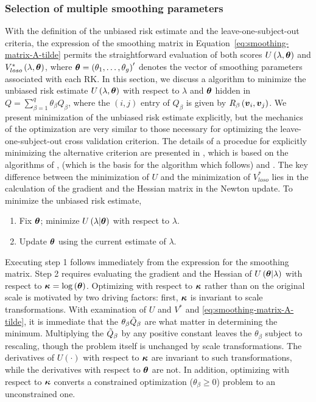\vspace{0.8in} 


\subsubsection{Selection of multiple smoothing parameters}

With the definition of the unbiased risk estimate and the leave-one-subject-out criteria, the expression of the smoothing matrix in Equation~\ref{eq:smoothing-matrix-A-tilde} permits the straightforward evaluation of both scores $U\left(\lambda, \mbox{\boldmath $\theta$} \right)$ and $V_{loso}^*\left(\lambda, \mbox{\boldmath $\theta$} \right)$, where $\mbox{\boldmath $\theta$} = \left(\theta_1,\dots, \theta_g\right)'$ denotes the vector of smoothing parameters associated with each RK.  In this section, we discuss a algorithm to minimize the unbiased risk estimate $U\left(\lambda, \mbox{\boldmath $\theta$}\right)$ with respect to $\lambda$ and $\mbox{\boldmath $\theta$}$ hidden in $Q = \sum_{\beta = 1}^q \theta_\beta Q_\beta$, where the $\left(i,j\right)$ entry of $Q_\beta$ is given by $R_\beta\left(\mbox{\boldmath $v$}_i,\mbox{\boldmath $v$}_j\right)$.  We present minimization of the unbiased risk estimate explicitly, but the mechanics of the optimization are very similar to those necessary for optimizing the leave-one-subject-out cross validation criterion. The details of a procedue for explicitly minimizing the alternative criterion are presented in \cite{xu2012asymptotic}, which is based on the algorithms of \cite{gu1991minimizing}, \cite{kim2004smoothing} (which is the basis for the algorithm which follows) and \cite{wood2004stable}. The key difference between the minimization of $U$ and the minimization of $V^*_{loso}$ lies in the calculation of the gradient and the Hessian matrix in the Newton update. To minimize the unbiased risk estimate,

\begin{enumerate}
\item Fix $\mbox{\boldmath $\theta$}$; minimize $U\left(\lambda \vert \mbox{\boldmath $\theta$}\right)$ with respect to $\lambda$.
\item Update $\mbox{\boldmath $\theta$}$ using the current estimate of $\lambda$.
\end{enumerate}

\noindent
Executing step 1 follows immediately from the expression for the smoothing matrix. Step 2 requires evaluating the gradient and the Hessian of $U\left( \mbox{\boldmath $\theta$} \vert \lambda \right)$ with respect to $\mbox{\boldmath $\kappa$} = \log\left(\mbox{\boldmath $\theta$}\right)$. Optimizing with respect to $\mbox{\boldmath $\kappa$}$ rather than on the original scale is motivated by two driving factors: first, $\mbox{\boldmath $\kappa$}$ is invariant to scale transformations. With examination of $U$ and $V^*$ and \ref{eq:smoothing-matrix-A-tilde}, it is immediate that the $\theta_\beta \tilde{Q}_\beta$ are what matter in determining the minimum. Multiplying the $\tilde{Q}_\beta$ by any positive constant leaves the $\theta_\beta$ subject to rescaling, though the problem itself is unchanged by scale transformations. The derivatives of $U\left(\cdot\right)$ with respect to $\mbox{\boldmath $\kappa$}$ are invariant to such transformations, while the derivatives with respect to $\mbox{\boldmath $\theta$}$ are not. In addition, optimizing with respect to $\mbox{\boldmath $\kappa$}$ converts a constrained optimization ($\theta_\beta \ge 0$) problem to an unconstrained one.

